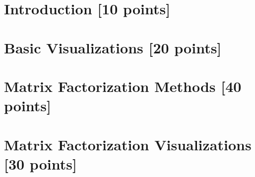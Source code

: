 \newif\ifshowsolutions
\showsolutionstrue







\pagestyle{fancy}


\newpage

\section{Introduction [10 points]}
\newpage

\section{Basic Visualizations [20 points]}
\newpage

\section{Matrix Factorization Methods [40 points]}
\newpage

\section{Matrix Factorization Visualizations [30 points]}
\newpage




